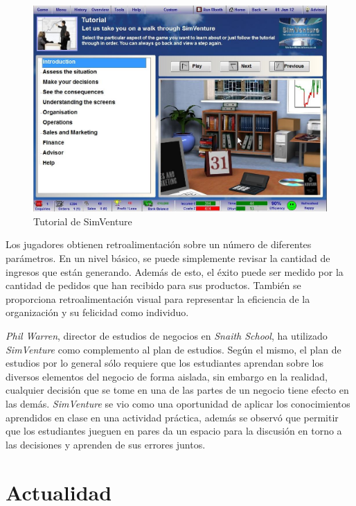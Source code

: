 \begin{figure}[ht!]
\centering 
\includegraphics[scale=0.5]{tics/images/simventure-tutorial.jpg}
\caption{Tutorial de SimVenture}
\label{fig:simventure_tutorial}
\end{figure}

Los jugadores obtienen retroalimentación sobre un número de diferentes
parámetros. En un nivel básico, se puede simplemente revisar la cantidad de
ingresos que están generando. Además de esto, el éxito puede ser medido por la
cantidad de pedidos que han recibido para sus productos. También se proporciona
retroalimentación visual para representar la eficiencia de la organización y su
felicidad como individuo.

\emph{Phil Warren}, director de estudios de negocios en \emph{Snaith School}, ha
utilizado \emph{SimVenture} como complemento al plan de estudios. Según el
mismo, el plan de estudios por lo general sólo requiere que los estudiantes
aprendan sobre los diversos elementos del negocio de forma aislada, sin embargo
en la realidad, cualquier decisión que se tome en una de las partes de un
negocio tiene efecto en las demás. \emph{SimVenture} se vio como una oportunidad
de aplicar los conocimientos aprendidos en clase en una actividad práctica,
además se observó que permitir que los estudiantes jueguen en pares da un
espacio para la discusión en torno a las decisiones y aprenden de sus errores
juntos\cite{education:games}.

\section{Actualidad}

